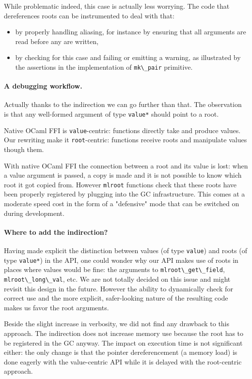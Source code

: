 \documentclass[a4paper]{easychair}
\newcommand{\cpp}[1]{\lstinline[style=C++]{#1}}
\begin{document}
While problematic indeed, this case is actually less worrying. The code
that dereferences roots can be instrumented to deal with that:
%
\begin{itemize}
\item by properly handling aliasing, for instance by ensuring that all
      arguments are read before any are written,
\item by checking for this case and failing or emitting a warning, as
      illustrated by the assertions in the implementation of
      \cpp{mk\_pair} primitive. 
\end{itemize}

\paragraph{A debugging workflow.} Actually thanks to the indirection we can go
further than that. The observation is that any well-formed argument of type
\cpp{value*} should point to a root. 

Native OCaml FFI is \texttt{value}-centric: functions directly take and produce
values. Our rewriting make it \texttt{root}-centric: functions receive roots
and manipulate values though them.

With native OCaml FFI the connection between a root and its value is lost: when
a value argument is passed, a copy is made and it is not possible to know which
root it got copied from.  However \cpp{mlroot} functions check that these roots
have been properly registered by plugging into the GC infrastructure. This
comes at a moderate speed cost in the form of a "defensive" mode that can be
switched on during development.

\paragraph{Where to add the indirection?}

Having made explicit the distinction between values (of type
\cpp{value}) and roots (of type \cpp{value*}) in the API, one
could wonder why our API makes use of roots in places where values would
be fine: the arguments to \cpp{mlroot\_get\_field}, \cpp{mlroot\_long\_val},
etc.  We are not totally decided on this issue and might revisit this design
in the future. However the ability to dynamically check for correct use
and the more explicit, safer-looking nature of the resulting code makes
us favor the root arguments.

Beside the slight increase in verbosity, we did not find any drawback to
this approach.  The indirection does not increase memory use because the root
has to be registered in the GC anyway. The impact on execution time is not significant either: the only change is that the pointer dereferencement (a memory load) is done eagerly with the value-centric API while it is delayed with the root-centric approach.
\end{document}
